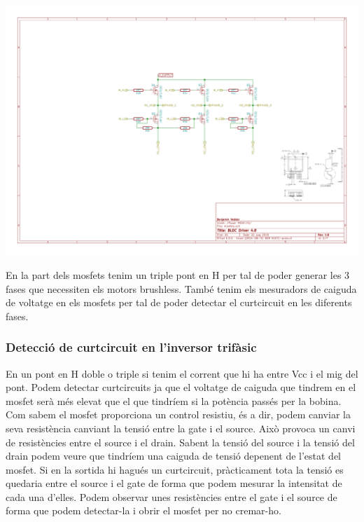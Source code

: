 \includegraphics[width=\textwidth]{VESC/Schematic-2}
 
En la part dels mosfets tenim un triple pont en H per tal de poder generar les 3 fases que necessiten els motors brushless. També tenim els mesuradors de caiguda de voltatge en els mosfets per tal de poder detectar el curtcircuit en les diferents fases.
 
\subsubsection{Detecció de curtcircuit en l'inversor trifàsic}
 
 En un pont en H doble o triple si tenim el corrent que hi ha entre Vcc i el mig del pont. Podem detectar curtcircuits ja que el voltatge de caiguda que tindrem en el mosfet serà més elevat que el que tindríem si la potència passés per la bobina. Com sabem el mosfet proporciona un control resistiu, és a dir, podem canviar la seva resistència canviant la tensió entre la gate i el source. Això provoca un canvi de resistències entre el source i el drain. Sabent la tensió del source i la tensió del drain podem veure que tindríem una caiguda de tensió depenent de l'estat del mosfet. Si en la sortida hi hagués un curtcircuit, pràcticament tota la tensió es quedaria entre el source i el gate de forma que podem mesurar la intensitat de cada una d'elles. Podem observar unes resistències entre el gate i el source de forma que podem detectar-la i obrir el mosfet per no cremar-ho.
  
